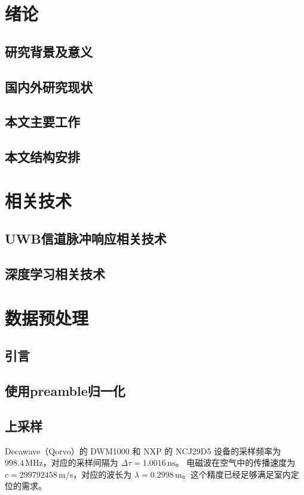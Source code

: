 \chapter{绪论}
\section{研究背景及意义}
\section{国内外研究现状}
\section{本文主要工作}
\section{本文结构安排}

\chapter{相关技术}
\section{UWB信道脉冲响应相关技术}
\section{深度学习相关技术}

\chapter{数据预处理}
\section{引言}
\section{使用preamble归一化}
\section{上采样}
Decawave（Qorvo）的 DWM1000 和 NXP 的 NCJ29D5 设备的采样频率为 \(998.4 \, \text{MHz}\)，对应的采样间隔为 \( \Delta \tau = 1.0016 \, \text{ns}\)。
电磁波在空气中的传播速度为 \(c = 299792458 \, \text{m/s}\)，对应的波长为 \(\lambda = 0.2998 \, \text{m}\)。这个精度已经足够满足室内定位的需求。

